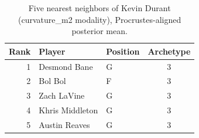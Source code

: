 \begin{table}[htbp]
  \centering\small
  \begin{tabular}{rllc}
    \toprule
    Rank & Player & Position & Archetype \\
    \midrule
    1 & Desmond Bane & G & 3 \\
    2 & Bol Bol & F & 3 \\
    3 & Zach LaVine & G & 3 \\
    4 & Khris Middleton & G & 3 \\
    5 & Austin Reaves & G & 3 \\
    \bottomrule
  \end{tabular}
  \caption{Five nearest neighbors of Kevin Durant (curvature_m2 modality), Procrustes-aligned posterior mean.}
  \label{tab:Kevin_Durant_neighbors_curvature_m2}
\end{table}


